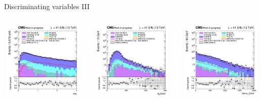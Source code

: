 \documentclass[8pt]{beamer}
\begin{document}
\begin{frame}{Discriminating variables III}
\begin{columns}
\begin{column}{0.33\textwidth}
\begin{center}
    		\end{center}		
		\end{column}
\end{columns}
\vspace{-5pt}
\begin{columns}
		\begin{column}{0.33\textwidth}
			\begin{center}
     			\includegraphics[width=1.0\textwidth, height=105pt]{figs/2017/SmearSR-ttDM-scalar100/log_cratio_topCR_ll_r2l4j.png}
    		\end{center}		
		\end{column}
		\begin{column}{0.33\textwidth}
			\begin{center}
     			\includegraphics[width=1.0\textwidth, height=105pt]{figs/2017/SmearSR-ttDM-scalar100/log_cratio_topCR_ll_mblt.png}
    		\end{center}		
		\end{column}
		\begin{column}{0.33\textwidth}
			\begin{center}
     			\includegraphics[width=1.0\textwidth, height=105pt]{figs/2017/SmearSR-ttDM-scalar100/log_cratio_topCR_ll_dark_pt.png}
    		\end{center}		
		\end{column}
\end{columns} \vfill
\end{frame}
\end{document}
